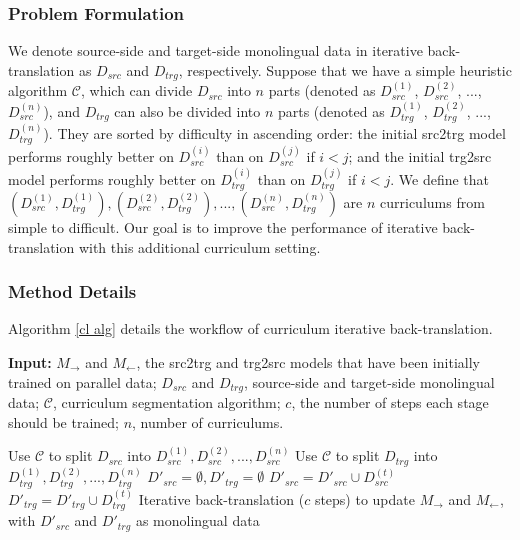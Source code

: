 \documentclass[letterpaper]{article} %
\begin{document}
\subsubsection{Problem Formulation}

We denote source-side and target-side monolingual data in iterative back-translation as $D_{src}$ and $D_{trg}$, respectively.
Suppose that we have a simple heuristic algorithm $\mathcal{C}$, which can divide $D_{src}$ into $n$ parts (denoted as $D_{src}^{(1)}$, $D_{src}^{(2)}$, ..., $D_{src}^{(n)}$), and $D_{trg}$ can also be divided into $n$ parts (denoted as $D_{trg}^{(1)}$, $D_{trg}^{(2)}$, ..., $D_{trg}^{(n)}$).
They are sorted by difficulty in ascending order:
the initial src2trg model performs roughly better on $D_{src}^{(i)}$ than on $D_{src}^{(j)}$ if $i<j$;
and the initial trg2src model performs roughly better on $D_{trg}^{(i)}$ than on $D_{trg}^{(j)}$ if $i<j$.
We define that $(D_{src}^{(1)}, D_{trg}^{(1)}), (D_{src}^{(2)}, D_{trg}^{(2)}), ..., (D_{src}^{(n)}, D_{trg}^{(n)})$ are $n$ curriculums from simple to difficult.
Our goal is to improve the performance of iterative back-translation with this additional curriculum setting.

\subsubsection{Method Details}

Algorithm \ref{cl alg} details the workflow of curriculum iterative back-translation.

\begin{algorithm}[!h]
\small
	\caption{Curriculum Iterative Back-Translation}
	\label{cl alg}
	\textbf{Input:} $M_{\rightarrow}$ and $M_{\leftarrow}$, the src2trg and trg2src models that have been initially trained on parallel data; $D_{src}$ and $D_{trg}$, source-side and target-side monolingual data; $\mathcal{C}$, curriculum segmentation algorithm; $c$, the number of steps each stage should be trained; $n$, number of curriculums.
	\begin{algorithmic}[1]
		\State Use $\mathcal{C}$ to split $D_{src}$ into $D^{(1)}_{src}, D^{(2)}_{src}, ..., D^{(n)}_{src}$
		\State Use $\mathcal{C}$ to split $D_{trg}$ into $D^{(1)}_{trg}, D^{(2)}_{trg}, ..., D^{(n)}_{trg}$
		\State $D'_{src}=\emptyset, D'_{trg}=\emptyset$
		 
		\State $D'_{src} = D'_{src} \cup D^{(t)}_{src}$
		\State $D'_{trg} = D'_{trg} \cup D^{(t)}_{trg}$
		\State Iterative back-translation ($c$ steps) to update $M_{\rightarrow}$ and $M_{\leftarrow}$, with $D'_{src}$ and $D'_{trg}$ as monolingual data
		\EndFor
	\end{algorithmic}
\end{algorithm}
\end{document}
